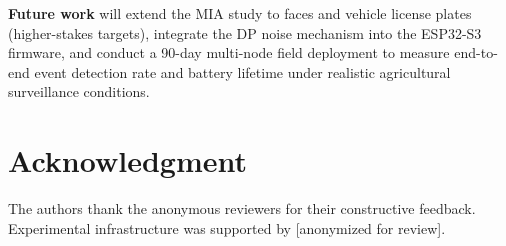 \documentclass[journal]{IEEEtran}
\begin{document}
\textbf{Future work} will extend the MIA study to faces and
vehicle license plates (higher-stakes targets), integrate the
DP noise mechanism into the ESP32-S3 firmware, and conduct a
90-day multi-node field deployment to measure end-to-end
event detection rate and battery lifetime under realistic
agricultural surveillance conditions.

\section*{Acknowledgment}
The authors thank the anonymous reviewers for their constructive
feedback. Experimental infrastructure was supported by
[anonymized for review].



\end{document}
